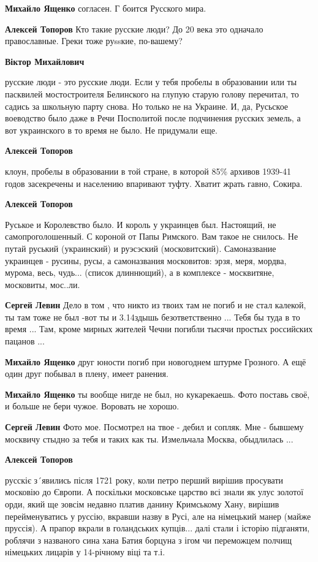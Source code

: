 \begin{itemize}
\begin{itemize}
\textbf{Михайло Ященко} согласен. Г боится Русского мира.

\textbf{Алексей Топоров} Кто такие русские люди? До 20 века это одначало православные. Греки тоже руssкие, по-вашему?

\textbf{Віктор Михайлович} 

русские люди - это русские люди. Если у тебя пробелы в образовании или ты
пасквилей мостостроителя Белинского на глупую старую голову перечитал, то
садись за школьную парту снова. Но только не на Украине. И, да, Русьское
воеводство было даже в Речи Посполитой после подчинения русских земель, а вот
украинского в то время не было. Не придумали еще.

\textbf{Алексей Топоров} 

клоун, пробелы в образовании в той стране, в которой 85\% архивов 1939-41 годов
засекречены и населению впаривают туфту. Хватит жрать гавно, Сокира.


\textbf{Алексей Топоров} 

Руськое и Королевство было. И король у украинцев был. Настоящий, не
самопроголошенный. С короной от Папы Римского. Вам такое не снилось. Не путай
руський (украинский) и руэсэский (московитский). Самоназвание украинцев -
русины, русы, а самоназвания московитов: эрзя, меря, мордва, мурома, весь,
чудь... (список длиннющий), а в комплексе - москвитяне, московиты, мос..ли.

\textbf{Сергей Левин} Дело в том , что никто из твоих там не погиб и не стал калекой, ты там тоже не был -вот ты и 3.14здышь безответственно ... Тебя бы туда в то время ... Там, кроме мирных жителей Чечни погибли тысячи простых российских пацанов ...

\textbf{Михайло Ященко} друг юности погиб при новогоднем штурме Грозного. А ещё один друг побывал в плену, имеет ранения.

\textbf{Михайло Ященко} ты вообще нигде не был, но кукарекаешь.
Фото поставь своё, и больше не бери чужое. Воровать не хорошо.

\textbf{Сергей Левин} Фото мое. Посмотрел на твое - дебил и сопляк. Мне - бывшему москвичу стыдно за тебя и таких как ты. Измельчала Москва, обыдлилась ...

\textbf{Алексей Топоров} 

русскіє з´явились після 1721 року, коли петро перший вирішив просувати московію
до Європи. А поскільки московське царство всі знали як улус золотої орди, який
ще зовсім недавно платив данину Кримському Хану, вирішив перейменуватись у
руссію, вкравши назву в Русі, але на німецький манер (майже пруссія). А прапор
вкрали в голандських купців... далі стали і історію підганяти, роблячи з
названого сина хана Батия борцуна з ігом чи переможцем полчищ німецьких лицарів
у 14-річному віці та т.і.



\end{itemize}
\end{itemize}
